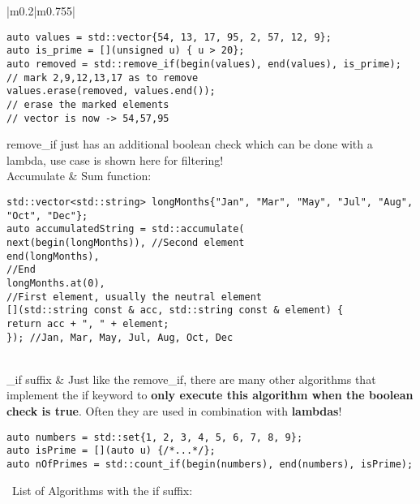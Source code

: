 \documentclass[main.tex,fontsize=8pt,paper=a4,paper=portrait,DIV=calc,]{scrartcl}
\begin{document}
\begin{table}[ht!]
\begin{tabular}{|m{0.2\linewidth}|m{0.755\linewidth}|}
\begin{lstlisting}
auto values = std::vector{54, 13, 17, 95, 2, 57, 12, 9};
auto is_prime = [](unsigned u) { u > 20};
auto removed = std::remove_if(begin(values), end(values), is_prime);
// mark 2,9,12,13,17 as to remove
values.erase(removed, values.end());
// erase the marked elements
// vector is now -> 54,57,95
\end{lstlisting} 
remove\_if just has an additional boolean check which can be done with a lambda, use case is shown here for filtering!\\
\hline
Accumulate & 
Sum function:\newline
\begin{lstlisting}
std::vector<std::string> longMonths{"Jan", "Mar", "May", "Jul", "Aug", "Oct", "Dec"};
auto accumulatedString = std::accumulate(
next(begin(longMonths)), //Second element
end(longMonths),
//End
longMonths.at(0),
//First element, usually the neutral element
[](std::string const & acc, std::string const & element) {
return acc + ", " + element;
}); //Jan, Mar, May, Jul, Aug, Oct, Dec
\end{lstlisting}\\
\hline
\_if suffix & 
Just like the remove\_if, there are many other algorithms that implement the if keyword to \textbf{only execute this algorithm when the boolean check is true}.\newline
Often they are used in combination with \textbf{lambdas}!
\begin{lstlisting}
auto numbers = std::set{1, 2, 3, 4, 5, 6, 7, 8, 9};
auto isPrime = [](auto u) {/*...*/};
auto nOfPrimes = std::count_if(begin(numbers), end(numbers), isPrime);
\end{lstlisting}
\, \newline
List of Algorithms with the if suffix:\newline
\minipg{
\begin{itemize}
\item \textcolor{teal}{count\_if}
\item \textcolor{teal}{find\_if}
\item \textcolor{teal}{find\_if\_not}
\item \textcolor{teal}{copy\_if}
\end{itemize} 
}{\begin{itemize}
\item \textcolor{teal}{count\_if}
\item \textcolor{teal}{find\_if}
\item \textcolor{teal}{find\_if\_not}

\end{itemize}}
\end{tabular}
\end{table}
\end{document}
